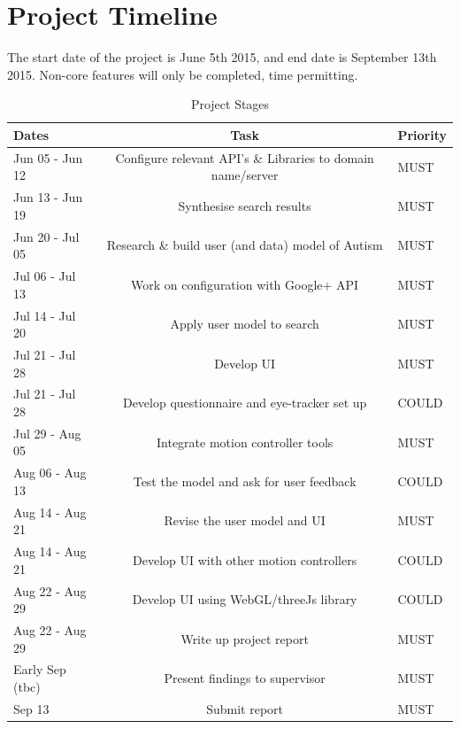 \documentclass[a4paper, 11pt]{article}
\begin{document}
\begin{justify}
\begin{table}[H]
\begin{tabular}{|c | c | p{6cm} | p{6cm} |}
\end{tabular}
\label{risks} 
\end{table}

\section{Project Timeline}\label{plan}
The start date of the project is June 5th 2015, and end date is September 13th 2015. Non-core features will only be completed, time permitting.
\begin{table}[H]
\caption{Project Stages} 
\centering
\begin{tabular}{ | L |c| L |}
\hline\hline 
Dates & Task & Priority\\ [0.5ex]
\hline 
Jun 05 - Jun 12 & Configure relevant API's \& Libraries to domain name/server & MUST\\
\hline 
Jun 13 - Jun 19 & Synthesise search results & MUST\\
\hline 
Jun 20 - Jul 05 & Research \& build user (and data) model of Autism & MUST\\
\hline 
Jul 06 - Jul 13 & Work on configuration with Google+ API & MUST\\
\hline 
Jul 14 - Jul 20 & Apply user model to search& MUST\\ 
\hline 
Jul 21 - Jul 28 & Develop UI & MUST\\
\hline 
Jul 21 - Jul 28 & Develop questionnaire and eye-tracker set up & COULD\\
\hline 
Jul 29 - Aug 05 & Integrate motion controller tools& MUST\\
\hline 
Aug 06 - Aug 13 & Test the model and ask for user feedback & COULD\\
\hline 
Aug 14 - Aug 21 & Revise the user model and UI & MUST\\
\hline 
Aug 14 - Aug 21 & Develop UI with other motion controllers & COULD\\
\hline 
Aug 22 - Aug 29 & Develop UI using WebGL/threeJs library & COULD\\
\hline 
Aug 22 - Aug 29 & Write up project report & MUST\\ 
\hline 
Early Sep (tbc) & Present findings to supervisor & MUST\\
\hline 
Sep 13 & Submit report & MUST\\[0.5ex]
\hline
\end{tabular}
\label{stages} 
\end{table}


\end{justify}
\end{document}
